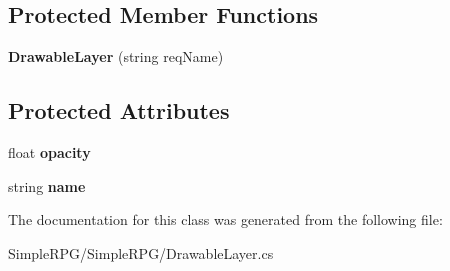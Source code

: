 \subsection*{Protected Member Functions}
\begin{DoxyCompactItemize}
\item 
\hypertarget{class_simple_r_p_g_1_1_drawable_layer_a015e72b02bc28151e2d42e6d22420c00}{{\bfseries Drawable\-Layer} (string req\-Name)}\label{class_simple_r_p_g_1_1_drawable_layer_a015e72b02bc28151e2d42e6d22420c00}

\end{DoxyCompactItemize}
\subsection*{Protected Attributes}
\begin{DoxyCompactItemize}
\item 
\hypertarget{class_simple_r_p_g_1_1_drawable_layer_a613c63f79a863ca37dbd1f18ea4c2915}{float {\bfseries opacity}}\label{class_simple_r_p_g_1_1_drawable_layer_a613c63f79a863ca37dbd1f18ea4c2915}

\item 
\hypertarget{class_simple_r_p_g_1_1_drawable_layer_ac006479228e4588dc3aef0d885c2cbfc}{string {\bfseries name}}\label{class_simple_r_p_g_1_1_drawable_layer_ac006479228e4588dc3aef0d885c2cbfc}

\end{DoxyCompactItemize}


The documentation for this class was generated from the following file\-:\begin{DoxyCompactItemize}
\item 
Simple\-R\-P\-G/\-Simple\-R\-P\-G/Drawable\-Layer.\-cs\end{DoxyCompactItemize}
